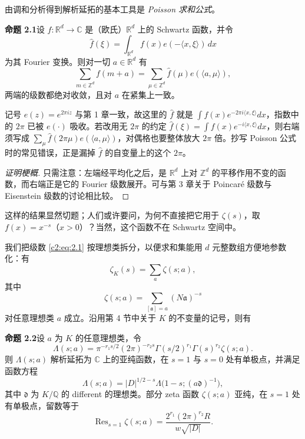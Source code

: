 由调和分析得到解析延拓的基本工具是 \emph{Poisson 求和公式}。

\par\medskip\noindent\textbf{命题 2.1}\quad 设 $f\colon\mathbb{R}^d\to\mathbb{C}$ 是（欧氏）$\mathbb{R}^d$ 上的 Schwartz 函数，并令
\[
\hat f(\xi)=\int_{\mathbb{R}^d}f(x)e(-\langle x,\xi\rangle)\,dx
\]
为其 Fourier 变换。则对一切 $a\in\mathbb{R}^d$ 有
\[
\sum_{m\in\mathbb{Z}^d}f(m+a)=\sum_{\mu\in\mathbb{Z}^d}\hat f(\mu)e(\langle a,\mu\rangle),
\]
两端的级数都绝对收敛，且对 $a$ 在紧集上一致。

\begin{annote}
记号 $e(z)=e^{2\pi iz}$ 与第 1 章一致，故这里的 $\hat f$ 就是 $\int f(x)e^{-2\pi i\langle x,\xi\rangle}dx$，指数中的 $2\pi$ 已被 $e(\cdot)$ 吸收。若改用无 $2\pi$ 的约定 $\hat f(\xi)=\int f(x)e^{-i\langle x,\xi\rangle}dx$，则右端须写成 $\sum_\mu\hat f(2\pi\mu)e(\langle a,\mu\rangle)$，对偶格也要整体放大 $2\pi$ 倍。抄写 Poisson 公式时的常见错误，正是漏掉 $\hat f$ 的自变量上的这个 $2\pi$。
\par\vspace{0.15em}{\raggedleft 【来源：Titchmarsh《The Theory of the Riemann Zeta-Function》第 2 章（A）；nLab “Poisson summation formula” 条目（B，与 A 交叉）】\par}
\end{annote}

\begin{proof}[证明梗概]
只需注意：左端经平均化之后，是 $\mathbb{R}^d$ 上对 $\mathbb{Z}^d$ 的平移作用不变的函数，而右端正是它的 Fourier 级数展开。可与第 3 章关于 Poincaré 级数与 Eisenstein 级数的讨论相比较。
\end{proof}

这样的结果显然切题；人们或许要问，为何不直接把它用于 $\zeta(s)$，取 $f(x)=x^{-s}$（$x>0$）？当然，这个函数不在 Schwartz 空间中。

我们把级数 \eqref{c2:eq:2.1} 按理想类拆分，以便求和集能用 $d$ 元整数组方便地参数化：有
\begin{equation}\tag{2.2}\label{c2:eq:2.2}
\zeta_K(s)=\sum_{a}\zeta(s;a),
\end{equation}
其中
\[
\zeta(s;a)=\sum_{[\mathfrak{a}]=a}(N\mathfrak{a})^{-s}
\]
对任意理想类 $a$ 成立。沿用第 4 节中关于 $K$ 的不变量的记号，则有

\par\medskip\noindent\textbf{命题 2.2}\quad 设 $a$ 为 $K$ 的任意理想类，令
\[
\Lambda(s;a)=\pi^{-r_1s/2}(2\pi)^{-r_2s}\Gamma(s/2)^{r_1}\Gamma(s)^{r_2}\zeta(s;a).
\]
则 $\Lambda(s;a)$ 解析延拓为 $\mathbb{C}$ 上的亚纯函数，在 $s=1$ 与 $s=0$ 处有单极点，并满足函数方程
\[
\Lambda(s;a)=|D|^{1/2-s}\Lambda\bigl(1-s;(a\mathfrak{d})^{-1}\bigr),
\]
其中 $\mathfrak{d}$ 为 $K/\mathbb{Q}$ 的 different 的理想类。部分 zeta 函数 $\zeta(s;a)$ 亚纯，在 $s=1$ 处有单极点，留数等于
\[
\operatorname{Res}_{s=1}\zeta(s;a)=\frac{2^{r_1}(2\pi)^{r_2}R}{w\sqrt{|D|}}.
\]


